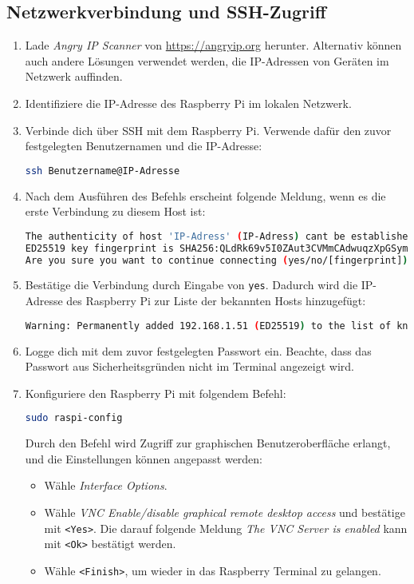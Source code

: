 \documentclass[a4paper,12pt]{article}
\begin{document}
\subsection{Netzwerkverbindung und SSH-Zugriff}
\begin{enumerate}
    \item Lade \textit{Angry IP Scanner} von \url{https://angryip.org} herunter. Alternativ können auch andere Lösungen verwendet werden, die IP-Adressen von Geräten im Netzwerk auffinden.
    \item Identifiziere die IP-Adresse des Raspberry Pi im lokalen Netzwerk.
    \item Verbinde dich über SSH mit dem Raspberry Pi. Verwende dafür den zuvor festgelegten Benutzernamen und die IP-Adresse:
\begin{lstlisting}[language=bash]
ssh Benutzername@IP-Adresse 
\end{lstlisting}
    \item Nach dem Ausführen des Befehls erscheint folgende Meldung, wenn es die erste Verbindung zu diesem Host ist:
\begin{lstlisting}[language=bash]
The authenticity of host 'IP-Adress' (IP-Adress) cant be established.
ED25519 key fingerprint is SHA256:QLdRk69v5I0ZAut3CVMmCAdwuqzXpGSymdHJB/FWars.
Are you sure you want to continue connecting (yes/no/[fingerprint])?
\end{lstlisting}
    \item Bestätige die Verbindung durch Eingabe von \texttt{yes}. Dadurch wird die IP-Adresse des Raspberry Pi zur Liste der bekannten Hosts hinzugefügt:
\begin{lstlisting}[language=bash]
Warning: Permanently added 192.168.1.51 (ED25519) to the list of known hosts.
\end{lstlisting}
    \item Logge dich mit dem zuvor festgelegten Passwort ein. Beachte, dass das Passwort aus Sicherheitsgründen nicht im Terminal angezeigt wird.
    \item Konfiguriere den Raspberry Pi mit folgendem Befehl:
\begin{lstlisting}[language=bash]
sudo raspi-config
\end{lstlisting}
    Durch den Befehl wird Zugriff zur graphischen Benutzeroberfläche erlangt, und die Einstellungen können angepasst werden:
    \begin{itemize}
        \item Wähle \textit{Interface Options}.
        \item Wähle \textit{VNC Enable/disable graphical remote desktop access} und bestätige mit \texttt{<Yes>}. Die darauf folgende Meldung \textit{The VNC Server is enabled} kann mit \texttt{<Ok>} bestätigt werden.
        \item Wähle \texttt{<Finish>}, um wieder in das Raspberry Terminal zu gelangen.
    \end{itemize}
\end{enumerate}
\end{document}
